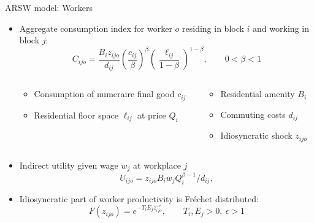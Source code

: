 \documentclass[11pt,notes=hide,aspectratio=169]{beamer}
\begin{document}
\begin{frame}{ARSW model: Workers }
\begin{itemize}
\item Aggregate consumption index for worker $o$ residing in block $i$ and working in block $j$:
\begin{equation*}
C_{ijo} = \frac{B_{i} z_{ijo}}{d_{ij}}
\left( \frac{c_{ij}}{\beta} \right)^{\beta } \left( \frac{\ell
_{ij }}{1-\beta} \right)^{1-\beta },\qquad 0<\beta <1
\end{equation*}
\vspace{-5mm}
\begin{columns}
\begin{column}{0.50\textwidth}
\begin{itemize}
\item Consumption of numeraire final good $c_{ij}$
\item Residential floor space $\ell_{ij}$ at price $Q_{i}$
\end{itemize}
\end{column}
\begin{column}{0.40\textwidth}
\begin{itemize}
\item Residential amenity $B_{i}$
\item Commuting costs $d_{ij}$
\item Idiosyncratic shock $z_{ijo}$ 
\end{itemize}
\end{column}
\end{columns}
\item Indirect utility given wage $w_j$ at workplace $j$
\begin{equation*}
U_{ijo} = z_{ijo} B_{i} w_{j} Q_{i}^{\beta-1} / d_{ij},
\end{equation*}
\item Idiosyncratic part of worker productivity is Fr\'{e}chet distributed:
\begin{equation*}
F(z_{ijo})=e^{-T_{i} E_{j} z_{ijo}^{-\epsilon }},\qquad T_{i}, E_{j} >0,\ \epsilon >1
\end{equation*}
\end{itemize}
\end{frame}
\end{document}
